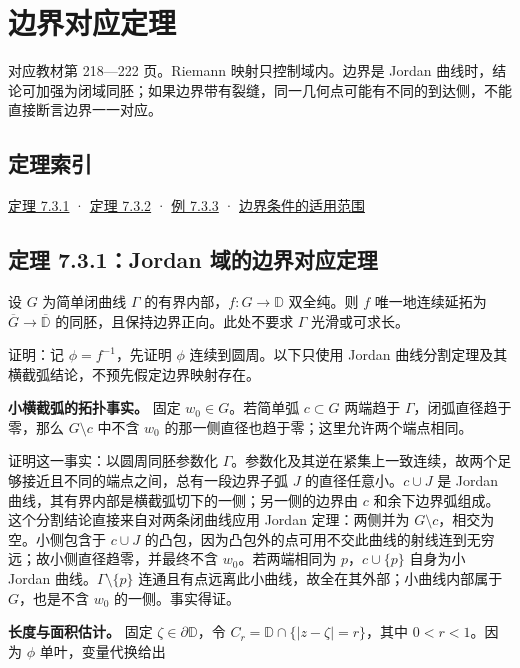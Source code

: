 \documentclass[11pt,a4paper]{article}
\begin{document}
\section{边界对应定理}
对应教材第 218---222 页。Riemann 映射只控制域内。边界是 Jordan
曲线时，结论可加强为闭域同胚；如果边界带有裂缝，同一几何点可能有不同的到达侧，不能直接断言边界一一对应。

\subsection*{定理索引}\label{ch07-s3-heading-1}

\hyperref[ch07-s3-heading-2]{定理 7.3.1} · \hyperref[ch07-s3-heading-3]{定理 7.3.2} ·
\hyperref[ch07-s3-heading-4]{例 7.3.3} ·
\hyperref[ch07-s3-heading-5]{边界条件的适用范围}

\subsection{定理 7.3.1：Jordan 域的边界对应定理}\label{ch07-s3-heading-2}

设 \(G\) 为简单闭曲线 \(\Gamma\) 的有界内部，\(f:G\to\mathbb D\)
双全纯。则 \(f\) 唯一地连续延拓为 \(\overline G\to\overline{\mathbb D}\)
的同胚，且保持边界正向。此处不要求 \(\Gamma\) 光滑或可求长。

证明：记 \(\phi=f^{-1}\)，先证明 \(\phi\) 连续到圆周。以下只使用 Jordan
曲线分割定理及其横截弧结论，不预先假定边界映射存在。

\textbf{小横截弧的拓扑事实。} 固定 \(w_0\in G\)。若简单弧 \(c\subset G\)
两端趋于 \(\Gamma\)，闭弧直径趋于零，那么 \(G\setminus c\) 中不含
\(w_0\) 的那一侧直径也趋于零；这里允许两个端点相同。

证明这一事实：以圆周同胚参数化
\(\Gamma\)。参数化及其逆在紧集上一致连续，故两个足够接近且不同的端点之间，总有一段边界子弧
\(J\) 的直径任意小。\(c\cup J\) 是 Jordan
曲线，其有界内部是横截弧切下的一侧；另一侧的边界由 \(c\)
和余下边界弧组成。这个分割结论直接来自对两条闭曲线应用 Jordan
定理：两侧并为 \(G\setminus c\)，相交为空。小侧包含于 \(c\cup J\)
的凸包，因为凸包外的点可用不交此曲线的射线连到无穷远；故小侧直径趋零，并最终不含
\(w_0\)。若两端相同为 \(p\)，\(c\cup\{p\}\) 自身为小 Jordan
曲线。\(\Gamma\setminus\{p\}\)
连通且有点远离此小曲线，故全在其外部；小曲线内部属于 \(G\)，也是不含
\(w_0\) 的一侧。事实得证。

\textbf{长度与面积估计。} 固定 \(\zeta\in\partial\mathbb D\)，令
\(C_r=\mathbb D\cap\{|z-\zeta|=r\}\)，其中 \(0<r<1\)。因为 \(\phi\)
单叶，变量代换给出
\end{document}
